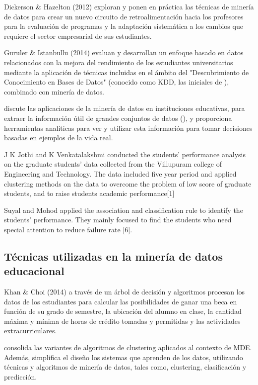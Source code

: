 Dickerson \& Hazelton (2012) exploran y ponen en práctica las técnicas de minería de datos para crear un nuevo circuito de retroalimentación hacia los profesores para la evaluación de programas y la adaptación sistemática a los cambios que requiere el sector empresarial de sus estudiantes.

Guruler \& Istanbullu (2014) evaluan y desarrollan un enfoque basado en datos relacionados con la mejora del rendimiento de los estudiantes universitarios mediante la aplicación de técnicas incluidas en el ámbito del "Descubrimiento de Conocimiento en Bases de Datos" (conocido como KDD, las iniciales de ), combinado con minería de datos. 

\textcite{sarala2015empirical} discute las aplicaciones de la minería de datos en instituciones educativas, para extraer la información útil de grandes conjuntos de datos (), y proporciona herramientas analíticas para ver y utilizar esta información para tomar decisiones basadas en ejemplos de la vida real.

J K Jothi and K Venkatalakshmi conducted the students’ performance analysis on the graduate students’ data collected from the Villupuram college of Engineering and Technology. The data included five year period and applied clustering methods on the data to overcome the problem of low score of graduate students, and to raise students academic performance[1]

Suyal and Mohod applied the association and classification rule to identify the students’ performance. They mainly focused to find the students who need special attention to reduce failure rate [6]. 

\subsection*{Técnicas utilizadas en la minería de datos educacional}

Khan \& Choi (2014) a través de un árbol de decisión y algoritmos procesan los datos de los estudiantes para calcular las posibilidades de ganar una beca en función de su grado de semestre, la ubicación del alumno en clase, la cantidad máxima y mínima de horas de crédito tomadas y permitidas y las actividades extracurriculares. 

\textcite{dutt2015clustering} consolida las variantes de algoritmos de clustering aplicados al contexto de MDE. Además, simplifica el diseño los sistemas que aprenden de los datos, utilizando técnicas y algoritmos de minería de datos, tales como, clustering, clasificación y predicción.

